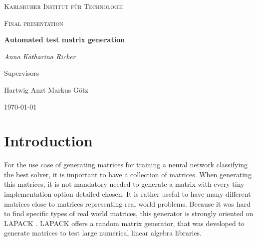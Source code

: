\documentclass[parskip=full]{scrartcl}
\begin{document}
	
	\begin{titlepage}
		\centering
		{\scshape\LARGE Karlsruher Institut für Technologie\par}
		\vspace{1cm}
		{\scshape\Large Final presentation\par}
		\vspace{1.5cm}
		{\huge\bfseries Automated test matrix generation\par}
		\vspace {2cm}
		
		{\Large\itshape Anna Katharina Ricker\par}
		
		\vfill
		Supervisors\par
		Hartwig Anzt
		Markus G\"{o}tz
		
		\vfill
		{\large\today\par}
	\end{titlepage}
	
	\tableofcontents
	\newpage
	
\section{Introduction}	
For the use case of generating matrices for training a neural network  classifying the best solver, it is important to have a collection of matrices. When generating this matrices, it is not mandatory needed to generate a matrix with every tiny implementation option detailed chosen. 
It is rather useful to have many different matrices close to matrices representing real world problems. Because it was hard to find specific types of real world matrices, this generator is strongly oriented on LAPACK \cite{LAPACK}. LAPACK offers a random matrix generator, that was developed to generate matrices to test large numerical linear algebra libraries. 
\end{document}
